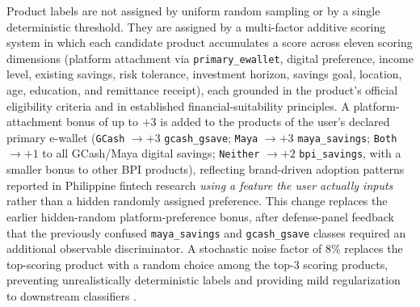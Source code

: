 \documentclass[journal]{./IEEE/IEEEtran}
\begin{document}
Product labels are not assigned by uniform random sampling or by a single deterministic threshold. They are assigned by a multi-factor additive scoring system in which each candidate product accumulates a score across eleven scoring dimensions (platform attachment via \texttt{primary\_ewallet}, digital preference, income level, existing savings, risk tolerance, investment horizon, savings goal, location, age, education, and remittance receipt), each grounded in the product's official eligibility criteria and in established financial-suitability principles. A platform-attachment bonus of up to $+3$ is added to the products of the user's declared primary e-wallet (\texttt{GCash} $\to+3$ \texttt{gcash\_gsave}; \texttt{Maya} $\to+3$ \texttt{maya\_savings}; \texttt{Both} $\to+1$ to all GCash/Maya digital savings; \texttt{Neither} $\to+2$ \texttt{bpi\_savings}, with a smaller bonus to other BPI products), reflecting brand-driven adoption patterns reported in Philippine fintech research \cite{ref9} \emph{using a feature the user actually inputs} rather than a hidden randomly assigned preference. This change replaces the earlier hidden-random platform-preference bonus, after defense-panel feedback that the previously confused \texttt{maya\_savings} and \texttt{gcash\_gsave} classes required an additional observable discriminator. A stochastic noise factor of 8\% replaces the top-scoring product with a random choice among the top-3 scoring products, preventing unrealistically deterministic labels and providing mild regularization to downstream classifiers \cite{ref46}.
\end{document}
